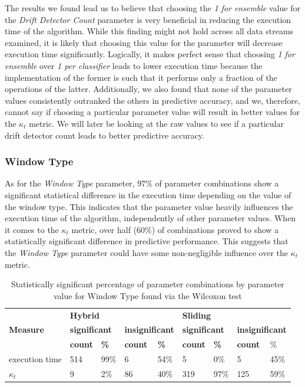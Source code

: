 The results we found lead us to believe that choosing the \textit{1 for ensemble} value for the \textit{Drift Detector Count} parameter is very beneficial in reducing the execution time of the algorithm. While this finding might not hold across all data streams examined, it is likely that choosing this value for the parameter will decrease execution time significantly. Logically, it makes perfect sense that choosing \textit{1 for ensemble} over \textit{1 per classifier} leads to lower execution time because the implementation of the former is such that it performs only a fraction of the operations of the latter. Additionally, we also found that none of the parameter values consistently outranked the others in predictive accuracy, and we, therefore, cannot say if choosing a particular parameter value will result in better values for the $\kappa_t$ metric. We will later be looking at the raw values to see if a particular drift detector count leads to better predictive accuracy.

\subsubsection{Window Type}
As for the \textit{Window Type} parameter, $97\%$ of parameter combinations show a significant statistical difference in the execution time depending on the value of the window type. This indicates that the parameter value heavily influences the execution time of the algorithm, independently of other parameter values. When it comes to the $\kappa_t$ metric, over half (60\%) of combinations proved to show a statistically significant difference in predictive performance. This suggests that the \textit{Window Type} parameter could have some non-negligible influence over the $\kappa_t$ metric.

\begin{table}[]
\centering
\caption{\label{table:wilcoxon_window_type}Statistically significant percentage of parameter combinations by parameter value for Window Type found via the Wilcoxon test}
\begin{tabular}{|l|l|l|l|l|l|l|l|l|}
\hline
\multirow{3}{*}{\textbf{Measure}} & \multicolumn{4}{l|}{\textbf{Hybrid}} & \multicolumn{4}{l|}{\textbf{Sliding}} \\ \cline{2-9} 
 & \multicolumn{2}{l|}{\textbf{significant}} & \multicolumn{2}{l|}{\textbf{insignificant}} & \multicolumn{2}{l|}{\textbf{significant}} & \multicolumn{2}{l|}{\textbf{insignificant}} \\ \cline{2-9} 
 & \textbf{count} & \textbf{\%} & \textbf{count} & \textbf{\%} & \textbf{count} & \textbf{\%} & \textbf{count} & \% \\ \hline \hhline{=========}
execution time & 514 & 99\% & 6 & 54\% & 5 & 0\% & 5 & 45\% \\ \hline
$\kappa_t$ & 9 & 2\% & 86 & 40\% & 319 & 97\% & 125 & 59\% \\ \hline
\end{tabular}
\end{table}


